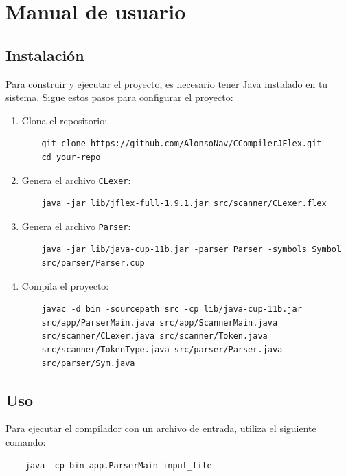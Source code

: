 \documentclass[a4paper,12pt]{article}
\begin{document}
\newpage

\section*{Manual de usuario}
\subsection*{Instalación}
Para construir y ejecutar el proyecto, es necesario tener Java instalado en tu sistema. Sigue estos pasos para configurar el proyecto:

\begin{enumerate}
    \item Clona el repositorio:
    \begin{verbatim}
    git clone https://github.com/AlonsoNav/CCompilerJFlex.git
    cd your-repo
    \end{verbatim}

    \item Genera el archivo \texttt{CLexer}:
    \begin{verbatim}
    java -jar lib/jflex-full-1.9.1.jar src/scanner/CLexer.flex
    \end{verbatim}

	\item Genera el archivo \texttt{Parser}:
	\begin{verbatim}
	java -jar lib/java-cup-11b.jar -parser Parser -symbols Symbol 
	src/parser/Parser.cup
	\end{verbatim}

    \item Compila el proyecto:
    \begin{verbatim}
    javac -d bin -sourcepath src -cp lib/java-cup-11b.jar 
	src/app/ParserMain.java src/app/ScannerMain.java 
	src/scanner/CLexer.java src/scanner/Token.java 
	src/scanner/TokenType.java src/parser/Parser.java 
	src/parser/Sym.java
    \end{verbatim}
\end{enumerate}

\subsection*{Uso}
Para ejecutar el compilador con un archivo de entrada, utiliza el siguiente comando:
\begin{verbatim}
    java -cp bin app.ParserMain input_file
\end{verbatim}
\end{document}
